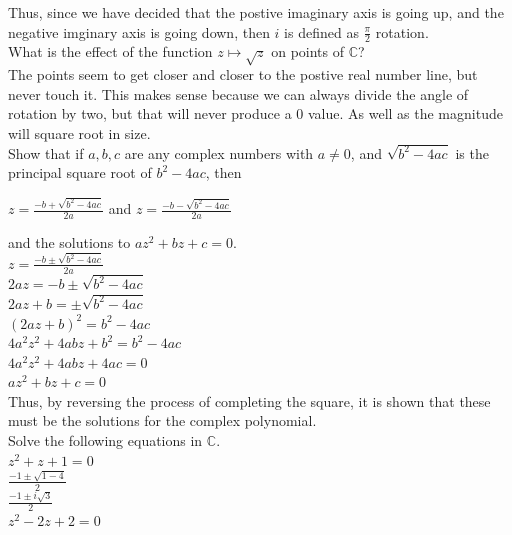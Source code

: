 \documentclass[12pt]{article}
\begin{document}
Thus, since we have decided that the postive imaginary axis is going up, and the negative imginary axis is going down, then $i$ is defined as $\frac{\pi}{2}$ rotation.\\



 What is the effect of the function $z \mapsto \sqrt{z}$ on points of $\mathbb{C}$?\\

The points seem to get closer and closer to the postive real number line, but never touch it.
This makes sense because we can always divide the angle of rotation by two, but that will never produce a 0 value.
As well as the magnitude will square root in size.\\


 Show that if $a,b,c$ are any complex numbers with $a \neq 0$, and $\sqrt{b^2 - 4ac}$ is the principal square root of $b^2 - 4ac$, then\\
\begin{center}
	$z = \frac{-b + \sqrt{b^2 - 4ac}}{2a}$ 
	and
	$z = \frac{-b - \sqrt{b^2 - 4ac}}{2a}$
\end{center}
and the solutions to $az^2 + bz + c = 0$.\\


$z = \frac{-b \pm \sqrt{b^2 - 4ac}}{2a}$\\ 
$2az = -b \pm \sqrt{b^2 - 4ac}$\\ 
$2az + b = \pm \sqrt{b^2 - 4ac}$\\ 
$(2az + b)^2 = b^2 - 4ac$\\ 
$4a^2z^2 + 4abz + b^2 = b^2 - 4ac$\\ 
$4a^2z^2 + 4abz + 4ac = 0$\\ 
$az^2 + bz + c = 0$\\

Thus, by reversing the process of completing the square, it is shown that these must be the solutions for the complex polynomial.\\


 Solve the following equations in $\mathbb{C}$.\\


 $z^2 + z + 1 = 0$\\

$\frac{-1 \pm \sqrt{1-4}}{2}$\\
$\frac{-1 \pm i\sqrt{3}}{2}$\\


 $z^2 - 2z + 2 = 0$\\
\end{document}
